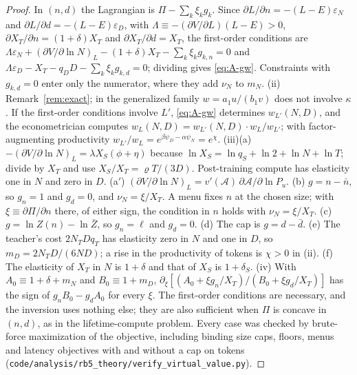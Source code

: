 \begin{proof}
In $(n,d)$ the Lagrangian is $\Pi-\sum_k\xi_kg_k$. Since $\partial L/\partial n=-(L-E)\varepsilon_N$ and
$\partial L/\partial d=-(L-E)\varepsilon_D$, with $\Lambda\equiv-(\partial V/\partial L)(L-E)>0$,
$\partial X_T/\partial n=(1+\delta)X_T$ and $\partial X_T/\partial d=X_T$, the first-order conditions are
$\Lambda\varepsilon_N+(\partial V/\partial\ln N)_L-(1+\delta)X_T-\sum_k\xi_kg_{k,n}=0$ and
$\Lambda\varepsilon_D-X_T-q_DD-\sum_k\xi_kg_{k,d}=0$; dividing gives \eqref{eq:A-gw}. Constraints with $g_{k,d}=0$ enter
only the numerator, where they add $\nu_N$ to $m_N$. (ii) Remark~\ref{rem:exact}; in the generalized family
$w=a_1u/(b_1v)$ does not involve $\kappa$. If the first-order conditions involve $L'$, \eqref{eq:A-gw} determines
$w_{L'}(N,D)$, and the econometrician computes $w_L(N,D)=w_{L'}(N,D)\cdot w_L/w_{L'}$; with factor-augmenting
productivity $w_{L'}/w_L=e^{\beta\psi_D-\alpha\psi_N}=e^{\chi}$. (iii)(a) $-(\partial V/\partial\ln N)_L=\lambda
X_S(\phi+\eta)$ because $\ln X_S=\ln q_S+\ln2+\ln N+\ln T$; divide by $X_T$ and use $X_S/X_T=\varrho T/(3D)$.
Post-training compute has elasticity one in $N$ and zero in $D$. (a$'$) $(\partial V/\partial\ln N)_L=v'(\mathcal
A)\,\partial\mathcal A/\partial\ln P_u$. (b) $g=n-\bar n$, so $g_n=1$ and $g_d=0$, and $\nu_N=\xi/X_T$. A menu fixes $n$ at
the chosen size; with $\xi\equiv\partial\Pi/\partial n$ there, of either sign, the condition in $n$ holds with
$\nu_N=\xi/X_T$. (c) $g=\ln Z(n)-\ln\bar Z$, so $g_n=\ell$ and $g_d=0$. (d) The cap is $g=d-\bar d$. (e) The teacher's cost
$2N_TDq_T$ has elasticity zero in $N$ and one in $D$, so $m_D=2N_TD/(6ND)$; a rise in the productivity of tokens is
$\chi>0$ in (ii). (f) The elasticity of $X_T$ in $N$ is $1+\delta$ and that of $X_S$ is $1+\delta_S$. (iv) With
$A_0\equiv1+\delta+m_N$ and $B_0\equiv1+m_D$, $\partial_\xi[(A_0+\xi g_n/X_T)/(B_0+\xi g_d/X_T)]$ has the sign of
$g_nB_0-g_dA_0$ for every $\xi$. The first-order conditions are necessary, and the inversion uses nothing else; they are
also sufficient when $\Pi$ is concave in $(n,d)$, as in the lifetime-compute problem. Every case was checked by brute-force
maximization of the objective, including binding size caps, floors, menus and latency objectives with and without a cap on
tokens (\texttt{code/analysis/rb5\_theory/verify\_virtual\_value.py}).
\end{proof}

